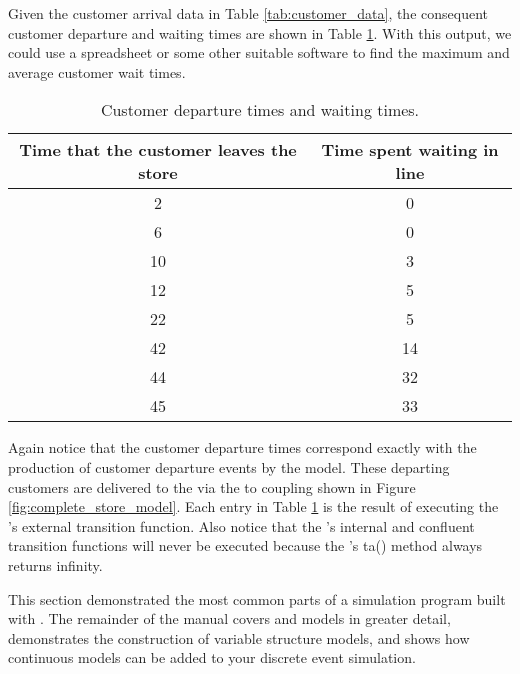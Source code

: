 Given the customer arrival data in Table \ref{tab:customer_data}, the consequent customer departure and waiting times are shown in Table \ref{tab:simulation_output}. With this output, we could use a spreadsheet or some other suitable software to find the maximum and average customer wait times.
\begin{table}
\centering
\begin{tabular}{|c|c|}
\hline
Time that the customer leaves the store & Time spent waiting in line \\ \hline
2 & 0 \\ \hline
6 & 0 \\ \hline
10 & 3 \\ \hline
12 & 5 \\ \hline
22 & 5 \\ \hline
42 & 14 \\ \hline
44 & 32 \\ \hline
45 & 33 \\ \hline
\end{tabular}
\caption{Customer departure times and waiting times.}
\label{tab:simulation_output}
\end{table}

Again notice that the customer departure times correspond exactly with the production of customer departure events by the  model. These departing customers are delivered to the  via the  to  coupling shown in Figure \ref{fig:complete_store_model}. Each entry in Table \ref{tab:simulation_output} is the result of executing the 's external transition function. Also notice that the 's internal and confluent transition functions will never be executed because the 's ta() method always returns infinity.

This section demonstrated the most common parts of a simulation program built with \adevs. The remainder of the manual covers  and  models in greater detail, demonstrates the construction of variable structure models, and shows how continuous models can be added to your discrete event simulation.
